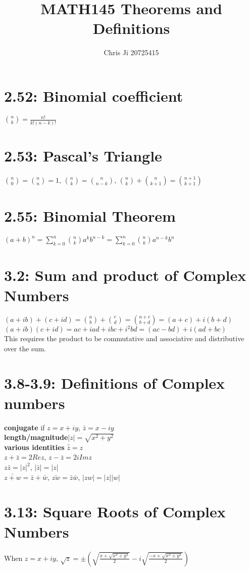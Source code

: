 \documentclass[10pt,letter]{article}
\begin{document}
\title{MATH145 Theorems and Definitions}
\author{Chris Ji 20725415}

\section*{2.52: Binomial coefficient}
${n\choose k} = \frac{n!}{k!(n-k)!}$

\section*{2.53: Pascal's Triangle}
${n\choose 0} = {n\choose n} = 1$, ${n \choose k} = {n\choose n-k}$, ${n \choose k} + {n \choose k + 1} = {n+1\choose k+1}$

\section*{2.55: Binomial Theorem}
$(a + b)^{n} = \sum_{k=0}^{n}{n \choose k}a^{k}b^{n-k} = \sum_{k=0}^{n}{n \choose k}a^{n-k}b^{n}$

\section*{3.2: Sum and product of Complex Numbers}
$(a + ib) + (c + id) = {a\choose b} + {c \choose d} = {a+c \choose b+d} = (a+c) + i(b+d)$\\ 
$(a+ib)(c+id) = ac + iad + ibc + i^2bd = (ac - bd) + i(ad + bc)$\\
This requires the product to be commutative and associative and distributive over the sum.

\section*{3.8-3.9: Definitions of Complex numbers}
\textbf{conjugate} if $z = x + iy$, $\bar{z} = x - iy$\\ 
\textbf{length/magnitude}$|z| = \sqrt{x^2+y^2}$\\
\textbf{various identities} $\bar{\bar{z}} = z$\\
$z + \bar{z} = 2Re z$, $z - \bar{z} = 2iIm z$\\ 
$z\bar{z} = |z|^2$, $|\bar{z}| = |z|$\\ 
$\bar{z+w} = \bar{z} + \bar{w}$, $\bar{zw} = \bar{z}\bar{w}$, $|zw| = |z||w|$ 

\section*{3.13: Square Roots of Complex Numbers}
When $z = x + iy$, $\sqrt{z} = \pm (\sqrt{\frac{x+\sqrt{x^2+y^2}}{2}} - i\sqrt{\frac{-x+\sqrt{x^2+y^2}}{2}})$
\end{document}
